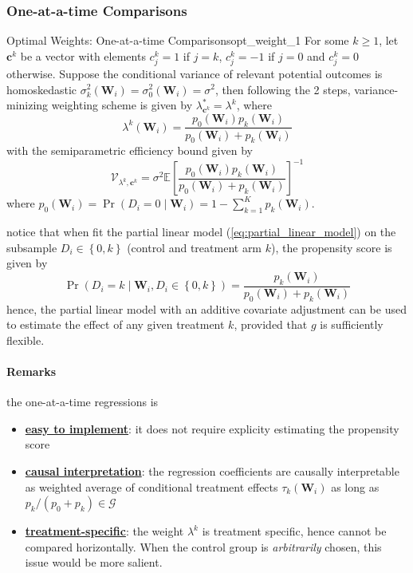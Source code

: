 \documentclass[twoside]{article}
\begin{document}
\subsubsection{One-at-a-time Comparisons}
\begin{corollary}{Optimal Weights: One-at-a-time Comparisons}{opt_weight_1}
    For some $k\geq 1$, let $\mathbf{c}^k$ be a vector with elements $c_j^k=1$ if $j=k$, $c_j^k = -1$ if $j=0$ and $c_j^k=0$ otherwise. Suppose the conditional variance of relevant potential outcomes is homoskedastic $\sigma^2_k(\mathbf{W}_i) = \sigma^2_0(\mathbf{W}_i) = \sigma^2$, then following the 2 steps, variance-minizing weighting scheme is given by $\lambda^*_{\mathbf{c}^k} = \lambda^k$, where 
    \begin{equation}
        \lambda^k(\mathbf{W}_i) = \frac{p_0(\mathbf{W}_i)p_k(\mathbf{W}_i)}{p_0(\mathbf{W}_i) + p_k(\mathbf{W}_i)}
    \end{equation}
    with the semiparametric efficiency bound given by 
    \begin{equation}
        \mathcal{V}_{\lambda^k,\mathbf{c}^k} = \sigma^2 \mathbb{E}\left[ \frac{p_0(\mathbf{W}_i)p_k(\mathbf{W}_i)}{p_0(\mathbf{W}_i)+p_k(\mathbf{W}_i)} \right]^{-1}
    \end{equation}
    where $p_0(\mathbf{W}_i) = \Pr(D_i=0\mid \mathbf{W}_i)=1-\sum^K_{k=1}p_k(\mathbf{W}_i)$.
\end{corollary}
notice that when fit the partial linear model (\ref{eq:partial_linear_model}) on the subsample $D_i\in \left\{ 0,k \right\}$ (control and treatment arm $k$), the propensity score is given by
$$
\Pr \left(D_i=k\mid \mathbf{W}_i,D_i \in \left\{0,k\right\}\right) = \frac{p_k(\mathbf{W}_i)}{p_0(\mathbf{W}_i)+ p_k(\mathbf{W}_i)}
$$
hence, the partial linear model with an additive covariate adjustment can be used to estimate the effect of any given treatment $k$, provided that $g$ is sufficiently flexible.

\paragraph*{Remarks} the one-at-a-time regressions is
\begin{itemize}
    \item \textbf{\underline{easy to implement}}: it does not require explicity estimating the propensity score
    \item \textbf{\underline{causal interpretation}}: the regression coefficients are causally interpretable as weighted average of conditional treatment effects $\tau_k(\mathbf{W}_i)$ as long as $p_k/(p_0+p_k)\in \mathcal{G}$
    \item \textcolor{myred}{\textbf{\underline{treatment-specific}}}: the weight $\lambda^k$ is treatment specific, hence cannot be compared horizontally. When the control group is \textit{arbitrarily} chosen, this issue would be more salient.
\end{itemize}
\end{document}
